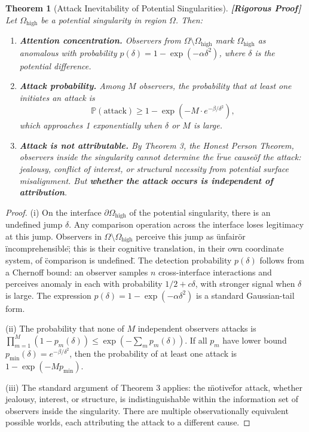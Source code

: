 \documentclass[12pt,a4paper]{article}
\newtheorem{theorem}{Theorem}[section]
\theoremstyle{remark}
\newcommand{\Pbb}{\mathbb{P}}
\newcommand{\rigorFull}{\textnormal{\textbf{[Rigorous Proof]}}}
\begin{document}
\begin{theorem}[Attack Inevitability of Potential Singularities]\label{thm:singularity_attack}\rigorFull
Let $\Omega_{\text{high}}$ be a potential singularity in region $\Omega$. Then:
\begin{enumerate}[label=(\roman*)]
    \item \textbf{Attention concentration.} Observers from $\Omega \setminus \Omega_{\text{high}}$ mark $\Omega_{\text{high}}$ as anomalous with probability $p(\delta) = 1 - \exp(-\alpha \delta^2)$, where $\delta$ is the potential difference.
    \item \textbf{Attack probability.} Among $M$ observers, the probability that at least one initiates an attack is
    \begin{equation}
        \Pbb(\text{attack}) \geq 1 - \exp\left(-M \cdot e^{-\beta/\delta^2}\right),
    \end{equation}
    which approaches 1 exponentially when $\delta$ or $M$ is large.
    \item \textbf{Attack is not attributable.} By Theorem 3, the Honest Person Theorem, observers inside the singularity cannot determine the \"true cause\" of the attack: jealousy, conflict of interest, or structural necessity from potential surface misalignment. But \textbf{whether the attack occurs is independent of attribution}.
\end{enumerate}
\end{theorem}

\begin{proof}
(i) On the interface $\partial\Omega_{\text{high}}$ of the potential singularity, there is an undefined jump $\delta$. Any comparison operation across the interface loses legitimacy at this jump. Observers in $\Omega \setminus \Omega_{\text{high}}$ perceive this jump as \"unfair\" or \"incomprehensible\"; this is their cognitive translation, in their own coordinate system, of \"comparison is undefined\". The detection probability $p(\delta)$ follows from a Chernoff bound: an observer samples $n$ cross-interface interactions and perceives anomaly in each with probability $1/2 + c\delta$, with stronger signal when $\delta$ is large. The expression $p(\delta) = 1 - \exp(-\alpha \delta^2)$ is a standard Gaussian-tail form.

(ii) The probability that none of $M$ independent observers attacks is $\prod_{m=1}^M (1 - p_m(\delta)) \leq \exp(-\sum_m p_m(\delta))$. If all $p_m$ have lower bound $p_{\min}(\delta) = e^{-\beta/\delta^2}$, then the probability of at least one attack is $1 - \exp(-M p_{\min})$.

(iii) The standard argument of Theorem 3 applies: the \"motive\" for attack, whether jealousy, interest, or structure, is indistinguishable within the information set of observers inside the singularity. There are multiple observationally equivalent possible worlds, each attributing the attack to a different cause.
\end{proof}
\end{document}
